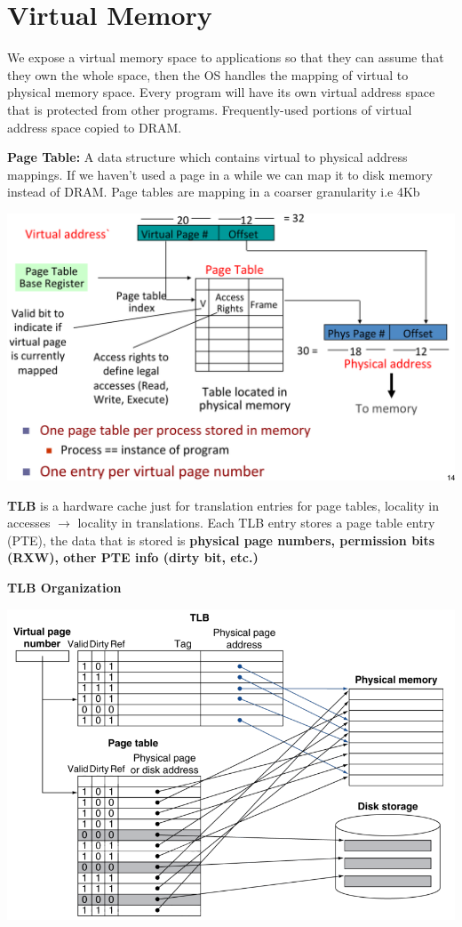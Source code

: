 \section{Virtual Memory}
We expose a virtual memory space to applications so that they can
assume that they own the whole space, then the OS handles the mapping of virtual
to physical memory space. Every program will have its own virtual address space
that is protected from other programs. Frequently-used portions of virtual address
space copied to DRAM.

\textbf{Page Table:} A data structure which contains virtual to physical address
mappings. If we haven't used a page in a while we can map it to disk memory instead
of DRAM. Page tables are mapping in a coarser granularity i.e 4Kb

\includegraphics[width=\linewidth]{png/pagetable.png}

\textbf{TLB} is a hardware cache just for translation entries for page tables,
locality in accesses $\rightarrow$ locality in translations. Each TLB entry stores
a page table entry (PTE), the data that is stored is
\textbf{physical page numbers, permission bits (RXW), other PTE info (dirty bit, etc.)}

\textbf{TLB Organization}

\includegraphics[width=\linewidth]{png/tlb.png}

